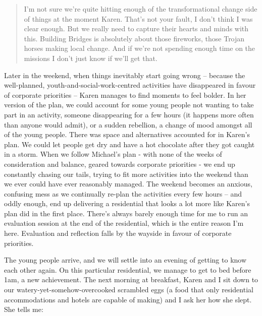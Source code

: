 \begin{quote}
I’m not sure we’re quite hitting enough of the transformational change side of things at the moment Karen. That’s not your fault, I don’t think I was clear enough. But we really need to capture their hearts and minds with this. Building Bridges is absolutely about those fireworks, those Trojan horses making local change. And if we’re not spending enough time on the missions I don’t just know if we’ll get that.
\end{quote}

Later in the weekend, when things inevitably start going wrong – because the well-planned, youth-and-social-work-centred activities have disappeared in favour of corporate priorities – Karen manages to find moments to feel bolder. In her version of the plan, we could account for some young people not wanting to take part in an activity, someone disappearing for a few hours (it happens more often than anyone would admit), or a sudden rebellion, a change of mood amongst all of the young people. There was space and alternatives accounted for in Karen's plan. We could let people get dry and have a hot chocolate after they got caught in a storm. When we follow Michael’s plan - with none of the weeks of consideration and balance, geared towards corporate priorities -  we end up constantly chasing our tails, trying to fit more activities into the weekend than we ever could have ever reasonably managed. The weekend becomes an anxious, confusing mess as we continually re-plan the activities every few hours – and oddly enough, end up delivering a residential that looks a lot more like Karen’s plan did in the first place. There’s always barely enough time for me to run an evaluation session at the end of the residential, which is the entire reason I’m here. Evaluation and reflection falls by the wayside in favour of corporate priorities. 

The young people arrive, and we will settle into an evening of getting to know each other again. On this particular residential, we manage to get to bed before 1am, a new achievement. The next morning at breakfast, Karen and I sit down to our watery-yet-somehow-overcooked scrambled eggs (a food that only residential accommodations and hotels are capable of making) and I ask her how she slept. She tells me:


